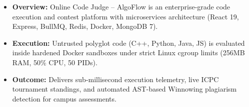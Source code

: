 \documentclass[10pt]{article}
\begin{document}
\begin{minipage}[t]{0.492\textwidth}

  \begin{tcolorbox}[
    equal height group=row1,
    colback=absbg, colframe=absframe,
    title={\textbf{\color{abstitle}Abstract}},
    fonttitle=\fontsize{8.5}{10}\selectfont,
    coltitle=abstitle, colbacktitle=absbg,
    boxrule=0.7pt, arc=1.5mm,
    top=3pt, bottom=3pt, left=4pt, right=4pt, toptitle=1pt, bottomtitle=1pt
  ]
  \fontsize{7.2}{8.6}\selectfont
  \begin{itemize}
    \item \textbf{Overview:} Online Code Judge -- AlgoFlow is an enterprise-grade code execution and contest platform with microservices architecture (React 19, Express, BullMQ, Redis, Docker, MongoDB 7).
    \item \textbf{Execution:} Untrusted polyglot code (C++, Python, Java, JS) is evaluated inside hardened Docker sandboxes under strict Linux cgroup limits (256MB RAM, 50\% CPU, 50 PIDs).
    \item \textbf{Outcome:} Delivers sub-millisecond execution telemetry, live ICPC tournament standings, and automated AST-based Winnowing plagiarism detection for campus assessments.
  \end{itemize}
  \end{tcolorbox}

  \vspace{1.5mm}


\end{minipage}
\end{document}
